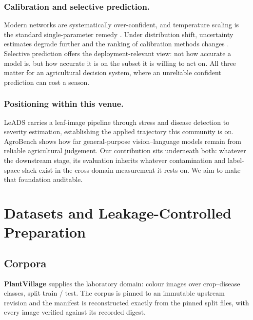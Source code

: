 \documentclass[runningheads]{llncs}
\begin{document}
\subsubsection{Calibration and selective prediction.}
Modern networks are systematically over-confident, and temperature scaling is
the standard single-parameter remedy \cite{guo2017calibration}. Under
distribution shift, uncertainty estimates degrade further and the ranking of
calibration methods changes \cite{ovadia2019trust}. Selective prediction
\cite{geifman2017selective} offers the deployment-relevant view: not how
accurate a model is, but how accurate it is on the subset it is willing to act
on. All three matter for an agricultural decision system, where an unreliable
confident prediction can cost a season.

\subsubsection{Positioning within this venue.}
LeADS \cite{das2025leads} carries a leaf-image pipeline through stress and
disease detection to severity estimation, establishing the applied trajectory
this community is on. AgroBench \cite{shinoda2025agrobench} shows how far
general-purpose vision--language models remain from reliable agricultural
judgement. Our contribution sits underneath both: whatever the downstream stage,
its evaluation inherits whatever contamination and label-space slack exist in
the cross-domain measurement it rests on. We aim to make that foundation
auditable.

\section{Datasets and Leakage-Controlled Preparation}

\subsection{Corpora}

\textbf{PlantVillage} supplies the laboratory domain: \NPv{} colour images over
\NPvClasses{} crop--disease classes, split \NPvTrain{} train / \NPvTest{} test.
The corpus is pinned to an immutable upstream revision and the manifest is
reconstructed exactly from the pinned split files, with every image verified
against its recorded digest.
\end{document}
